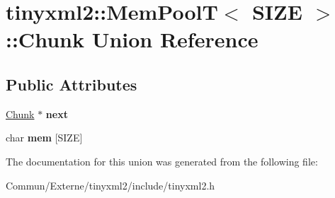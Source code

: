 \hypertarget{uniontinyxml2_1_1_mem_pool_t_1_1_chunk}{}\section{tinyxml2\+:\+:Mem\+PoolT$<$ S\+I\+ZE $>$\+:\+:Chunk Union Reference}
\label{uniontinyxml2_1_1_mem_pool_t_1_1_chunk}
\subsection*{Public Attributes}
\begin{DoxyCompactItemize}
\item 
\hyperlink{uniontinyxml2_1_1_mem_pool_t_1_1_chunk}{Chunk} $\ast$ {\bfseries next}\hypertarget{uniontinyxml2_1_1_mem_pool_t_1_1_chunk_ae97e0810e7bf7a28264f3e1f112d52b4}{}\label{uniontinyxml2_1_1_mem_pool_t_1_1_chunk_ae97e0810e7bf7a28264f3e1f112d52b4}

\item 
char {\bfseries mem} \mbox{[}S\+I\+ZE\mbox{]}\hypertarget{uniontinyxml2_1_1_mem_pool_t_1_1_chunk_a977aaaca9a6b080faada2ac779388ee6}{}\label{uniontinyxml2_1_1_mem_pool_t_1_1_chunk_a977aaaca9a6b080faada2ac779388ee6}

\end{DoxyCompactItemize}


The documentation for this union was generated from the following file\+:\begin{DoxyCompactItemize}
\item 
Commun/\+Externe/tinyxml2/include/tinyxml2.\+h\end{DoxyCompactItemize}
